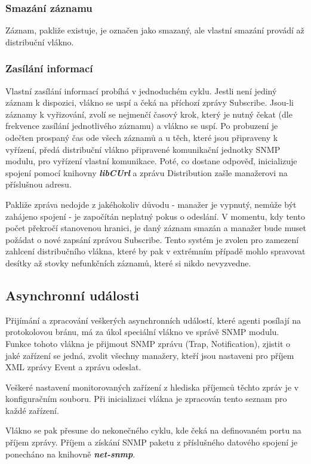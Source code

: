 \subsubsection*{Smazání záznamu}
Záznam, pakliže existuje, je označen jako smazaný, ale vlastní smazání provádí až distribuční vlákno.

\subsubsection*{Zasílání informací}
Vlastní zasílání informací probíhá v jednoduchém cyklu. Jestli není jediný záznam k dispozici, vlákno se uspí a čeká na příchozí zprávy Subscribe. Jsou-li záznamy
k vyřizování, zvolí se nejmenčí časový krok, který je nutný čekat (dle frekvence zasílání jednotlivého záznamu) a vlákno se uspí. Po probuzení je odečten
prospaný čas ode všech záznamů a u těch, které jsou připraveny k vyřízení, předá distribuční vlákno připravené komunikační jednotky SNMP modulu, pro vyřízení
vlastní komunikace. Poté, co dostane odpověď, inicializuje spojení pomocí knihovny \textbf{\textit{libCUrl}} a zprávu Distribution zašle manažerovi na příslušnou
adresu.

Pakliže zpráva nedojde z jakéhokoliv důvodu - manažer je vypnutý, nemůže být zahájeno spojení - je započítán neplatný pokus o odeslání. V momentu, kdy tento počet
překročí stanovenou hranici, je daný záznam smazán a manažer bude muset požádat o nové zapsání zprávou Subscribe. Tento systém je zvolen pro zamezení zahlcení 
distribučního vlákna, které by pak v extrémním případě mohlo spravovat desítky až stovky nefunkčních záznamů, které si nikdo nevyzvedne.


\subsection{Asynchronní události}
Přijímání a zpracování veškerých asynchronních událostí, které agenti posílají na protokolovou bránu, má za úkol speciální vlákno ve správě SNMP modulu.
Funkce tohoto vlákna je přijmout SNMP zprávu (Trap, Notification), zjistit o jaké zařízení se jedná, zvolit všechny manažery, kteří jsou nastaveni pro příjem
XML zprávy Event a zprávu odeslat.

Veškeré nastavení monitorovaných zařízení z hlediska příjemců těchto zpráv je v konfiguračním souboru. Při inicializaci vlákna je zpracován tento seznam pro každé
zařízení.

Vlákno se pak přesune do nekonečného cyklu, kde čeká na definovaném portu na příjem zprávy. Příjem a získání SNMP paketu z příslušného datového spojení je ponecháno
na knihovně \textbf{\textit{net-snmp}}.

